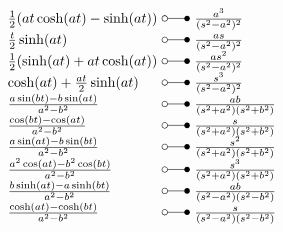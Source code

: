 \[ \begin{array}{@{}l@{ ~ \laplace ~ }l@{}}
\frac{1}{2} (at \cosh(at) - \sinh(at)) &
    \frac{a^3}{(s^2 - a^2)^2} \\
\frac{t}{2} \sinh(at) &
    \frac{as}{(s^2 - a^2)^2} \\
\frac{1}{2} (\sinh(at) + at \cosh(at)) &
    \frac{a s^2}{(s^2 - a^2)^2} \\
\cosh(at) + \frac{at}{2} \sinh(at) &
    \frac{s^3}{(s^2 - a^2)^2} \\
\frac{a \sin(bt) - b \sin(at)}{a^2 - b^2} &
    \frac{ab}{(s^2 + a^2) (s^2 + b^2)} \\
\frac{\cos(bt) - \cos(at)}{a^2 - b^2} &
    \frac{s}{(s^2 + a^2) (s^2 + b^2)} \\
\frac{a \sin(at) - b \sin(bt)}{a^2 - b^2} &
    \frac{s^2}{(s^2 + a^2) (s^2 + b^2)} \\
\frac{a^2 \cos(at) - b^2 \cos(bt)}{a^2 - b^2} &
    \frac{s^3}{(s^2 + a^2) (s^2 + b^2)} \\
\frac{b \sinh(at) - a \sinh(bt)}{a^2 - b^2} &
    \frac{ab}{(s^2 - a^2) (s^2 - b^2)} \\
\frac{\cosh(at) - \cosh(bt)}{a^2 - b^2} &
    \frac{s}{(s^2 - a^2) (s^2 - b^2)} \\
\end{array} \]

